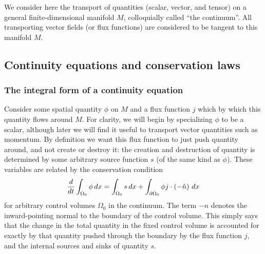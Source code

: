 We consider here the transport of quantities (scalar, vector, and tensor) on a general finite-dimensional manifold $M$,
colloquially called ``the continuum''. All transporting vector fields (or flux functions) are considered to be tangent to this manifold $M$.
\subsection{Continuity equations and conservation laws}\label{conservation_laws}
\subsubsection{The integral form of a continuity equation}
Consider some spatial quantity $\phi$ on $M$ and a flux function $j$ which by which
this quantity flows around $M$. For clarity, we will begin by specializing $\phi$ to be a scalar, although later we will find it useful to
transport vector quantities such as momentum. By definition we want this flux function to just push quantity around, and not create or destroy it:
the creation and destruction of quantity is determined by some arbitrary source function $s$ (of the same kind as $\phi$). These variables are related by the
conservation condition
\begin{equation}\label{continuity_equation}
    \frac{d}{dt} \int_{\Omega_0} \phi\,dx = \int_{\Omega_0} s\,dx + \int_{{\partial\Omega_0}} \phi j \cdot \left(-\hat{n}\right)\,dx
\end{equation}
for arbitrary control volumes $\Omega_0$ in the continuum. The term $-\hat{n}$ denotes the inward-pointing normal to the boundary of the control volume. This simply says that the change in the total quantity in the fixed control volume is accounted for exactly by that quantity pushed through the boundary by the flux function $j$, and the internal sources and sinks of quantity $s$.


